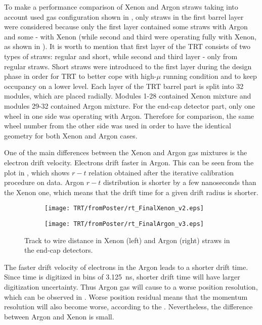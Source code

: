 To make a performance comparison of Xenon and Argon straws taking into account used gas configuration shown in ,
only straws in the first barrel layer were considered because only the first layer contained some straws with Argon and some - with Xenon 
(while second and third were operating fully with Xenon, as shown in ).
It is worth to mention that first layer of the TRT consists of two types of straws: regular and short, while second and third layer - only from regular straws.
Short straws were introduced to the first layer during the design phase in order for TRT to
better cope with high-$\mu$ running condition and to keep occupancy on a lower level.
Each layer of the TRT barrel part is split into 32 modules, which are placed radially. 
Modules 1-28 contained Xenon mixture and modules 29-32 contained Argon mixture.
For the end-cap detector part, only one wheel in one side was operating with Argon. Therefore for comparison, the same wheel number from the other side was used in order
to have the identical geometry for both Xenon and Argon cases.

One of the main differences between the Xenon and Argon gas mixtures is the electron drift velocity. Electrons drift faster in Argon. 
This can be seen from the plot in , 
which shows $r-t$ relation obtained after the iterative calibration procedure on data.
Argon $r-t$ distribution is shorter by a few nanoseconds than the Xenon one, which means that the drift time for a given drift radius is shorter.

\begin{figure}
\begin{subfigure}{.5\textwidth}
  \centering
  \texttt{[image: TRT/fromPoster/rt\_FinalXenon\_v2.eps]}
\end{subfigure}%
\begin{subfigure}{.5\textwidth}
  \centering
  \texttt{[image: TRT/fromPoster/rt\_FinalArgon\_v3.eps]}
\end{subfigure}

\caption{Track to wire distance in Xenon (left) and Argon (right) straws in the end-cap detectors.}
  \label{fig:RT_xenon_argon}
\end{figure}

The faster drift velocity of electrons in the Argon leads to a shorter drift time. Since time is digitized in bins of 3.125~ns, shorter drift time will have larger digitization uncertainty. Thus Argon gas will cause to a worse position resolution, which can be observed in . Worse position residual means that the momentum resolution will also become worse, according to the
. Nevertheless, the difference between Argon and Xenon is small.

